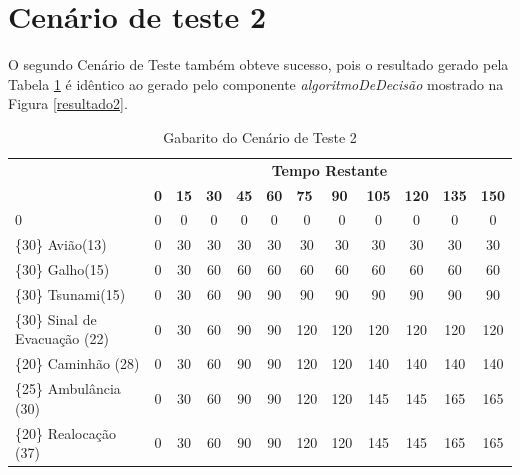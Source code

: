 \section{Cenário de teste 2}

	O segundo Cenário de Teste também obteve sucesso, pois o resultado gerado pela Tabela \ref{gabarito2} é idêntico ao gerado pelo componente \textit{algoritmoDeDecisão} mostrado na Figura \ref{resultado2}.
	
\begin{table}[!h]
\centering
\caption{Gabarito do Cenário de Teste 2}
\label{gabarito2}
\begin{tabular}{lccccccccccc}
\multicolumn{1}{c}{\cellcolor[HTML]{00D2CB}} & \multicolumn{11}{c}{\cellcolor[HTML]{00D2CB}\textbf{Tempo Restante}} \\ \multicolumn{1}{c}{\cellcolor[HTML]{00D2CB}{\color[HTML]{333333} \textbf{\{Valor\} Missão(Tempo)}}} & 
\multicolumn{1}{l}{\cellcolor[HTML]{C0F2F0}\textbf{0}} & 
\multicolumn{1}{l}{\cellcolor[HTML]{C0F2F0}\textbf{15}} & 
\multicolumn{1}{l}{\cellcolor[HTML]{C0F2F0}\textbf{30}} & 
\multicolumn{1}{l}{\cellcolor[HTML]{C0F2F0}\textbf{45}} & 
\multicolumn{1}{l}{\cellcolor[HTML]{C0F2F0}\textbf{60}} & 
\multicolumn{1}{l}{\cellcolor[HTML]{C0F2F0}\textbf{75}} & 
\multicolumn{1}{l}{\cellcolor[HTML]{C0F2F0}\textbf{90}} & 
\multicolumn{1}{l}{\cellcolor[HTML]{C0F2F0}\textbf{105}} & 
\multicolumn{1}{l}{\cellcolor[HTML]{C0F2F0}\textbf{120}} & 
\multicolumn{1}{l}{\cellcolor[HTML]{C0F2F0}\textbf{135}} & 
\multicolumn{1}{l}{\cellcolor[HTML]{C0F2F0}\textbf{150}} \\ 
0 & 0 & 0 & 0 & 0 & 0 & 0 & 0 & 0 & 0 & 0 & 0  \\ 
\{30\}  Avião(13) & 0 & 30 & 30 & 30 & 30 & 30 & 30 & 30 & 30 & 30 & 30 \\ 
\{30\}  Galho(15) & 0 & 30 & 60 & 60 & 60 & 60 & 60 & 60 & 60 & 60 & 60  \\ 
\{30\}  Tsunami(15) & 0 & 30 & 60 & 90 & 90 & 90 & 90 & 90 & 90 & 90 & 90 \\ 
\{30\}  Sinal de Evacuação (22) & 0 & 30 & 60 & 90 & 90 & 120  & 120  & 120 & 120 & 120 & 120 \\
\{20\}  Caminhão (28) & 0 & 30 & 60 & 90 & 90  & 120  & 120  & 140 & 140 & 140 & 140 \\ 
\{25\}  Ambulância (30) & 0 & 30 & 60 & 90 & 90  & 120  & 120  & 145 & 145 & 165 & 165 \\ 
{\color[HTML]{FE0000} \{20\}  Realocação (37)} & 0 & 30 & 60 & 90 & 90  & 120  & 120  & 145 & 145 & 165 & 165 \\  
\end{tabular}
\end{table}


